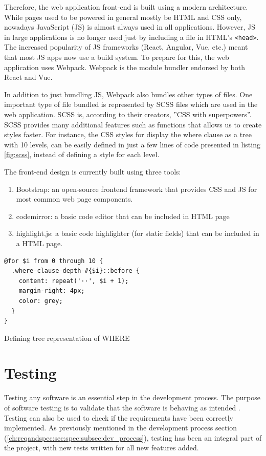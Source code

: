 Therefore, the web application front-end is built using a modern architecture. While pages used to be powered in general mostly be HTML and CSS only, nowadays JavaScript (JS) is almost always used in all applications. However, JS in large applications is no longer used just by including a file in HTML's \texttt{<head>}. The increased popularity of JS frameworks (React, Angular, Vue, etc.) meant that most JS apps now use a build system. To prepare for this, the web application uses Webpack.  Webpack is the  module bundler endorsed by both React and Vue.

In addition to just bundling JS, Webpack also bundles other types of files. One important type of file bundled is represented by SCSS files which are used in the web application. SCSS is, according to their creators, ''CSS with superpowers''. SCSS provides many additional features such as functions that allows us to create styles faster. For instance, the CSS styles for display the where clause as a tree with 10 levels, can be easily defined in just a few lines of code presented in listing \ref{fig:scss}, instead of defining a style for each level.

The front-end design is currently built using three tools:
\begin{enumerate}
    \item Bootstrap: an open-source frontend framework that provides CSS and JS for most common web page components.
    \item codemirror: a basic code editor that can be included in HTML page
    \item  highlight.js: a basic code highlighter (for static fields) that can be included in a HTML page.
\end{enumerate}

\begin{code}
\begin{verbatim}
@for $i from 0 through 10 {
  .where-clause-depth-#{$i}::before {
    content: repeat('··', $i + 1);
    margin-right: 4px;
    color: grey;
  }
}
\end{verbatim}
\caption{Defining tree representation of WHERE}
\label{fig:scss}
\end{code}

\section{Testing}
Testing any software is an essential step in the development process. The purpose of software testing is to validate that the software is behaving as intended \citep{lit:software_testing}. Testing can also be used to check if the requirements have been correctly implemented. As previously mentioned in the development process section (\ref{ch:reqandspec:sec:spec:subsec:dev_process}), testing has been an integral part of the project, with new tests written for all new features added.

